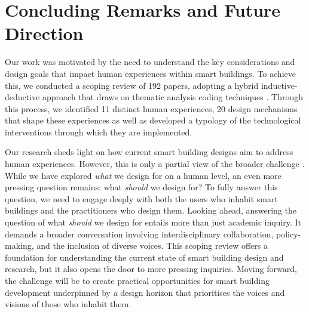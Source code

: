 \section{Concluding Remarks and Future Direction}
\label{sec-ch2:conclusion}
Our work was motivated by the need to understand the key considerations and design goals that impact human experiences within smart buildings. To achieve this, we conducted a scoping review of 192 papers, adopting a hybrid inductive-deductive approach that draws on thematic analysis coding techniques \cite{braun2023thematic}. Through this process, we identified 11 distinct human experiences, 20 design mechanisms that shape these experiences as well as developed a typology of the technological interventions through which they are implemented.

Our research sheds light on how current smart building designs aim to address human experiences. However, this is only a partial view of the broader challenge \cite{kirsh2019architects}. While we have explored \emph{what} we design for on a human level, an even more pressing question remains: what \emph{should} we design for? To fully answer this question, we need to engage deeply with both the users who inhabit smart buildings and the practitioners who design them. Looking ahead, answering the question of what \emph{should} we design for entails more than just academic inquiry. It demands a broader conversation involving interdisciplinary collaboration, policy-making, and the inclusion of diverse voices. This scoping review offers a foundation for understanding the current state of smart building design and research, but it also opens the door to more pressing inquiries. Moving forward, the challenge will be to create practical opportunities for smart building development underpinned by a design horizon that prioritises the voices and visions of those who inhabit them. 